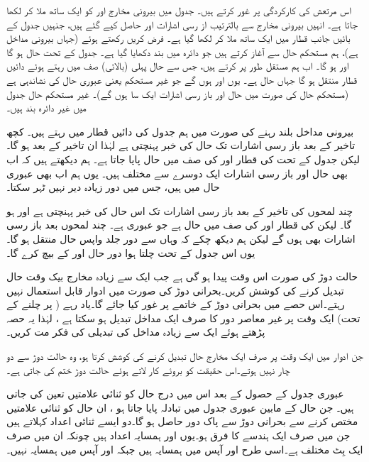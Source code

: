 اس مرتعش کی کارکردگی پر غور کرتے ہیں۔ جدول  میں بیرونی مخارج  اور  کو ایک  ساتھ ملا کر  لکھا جاتا ہے۔ انہیں بیرونی مخارج سے بالترتیب  از رسی  اشارات   اور  حاصل کیے  گئے  ہیں، جنہیں جدول کے بائیں جانب قطار میں ایک ساتھ ملا کر  لکھا گیا ہے۔  فرض کریں  رکھتے ہوئے (جہاں  بیرونی مداخل ہے)،  ہم مستحکم حال  سے آغاز کرتے ہیں جو دائرہ میں بند دکھایا گیا ہے۔ جدول کے تحت  حال  ہو گا اور   ہو گا۔ اب ہم  مستقل طور پر  کرتے ہیں، جس سے حال پہلی  (بالائی) صف  میں رہتے ہوئے دائیں قطار منتقل ہو گا جہاں حال  ہے۔ یوں  اور  ہوں گے جو غیر مستحکم یعنی عبوری حال کی نشاندہی ہے (مستحکم حال کی صورت میں حال اور باز رسی اشارات ایک سا ہوں گے)۔  غیر  مستحکم حال  جدول میں غیر  دائرہ بند ہیں۔

بیرونی مداخل بلند رہنے کی صورت میں ہم جدول کی  دائیں قطار میں رہتے ہیں۔    کچھ تاخیر کے بعد باز رسی اشارات تک حال  کی خبر پہنچتی ہے لہٰذا  ان تاخیر کے بعد  ہو گا۔ لیکن جدول کے تحت  کی قطار اور  کی صف میں  حال  پایا جاتا ہے۔ ہم دیکھتے ہیں کہ اب بھی  حال  اور باز رسی اشارات  ایک دوسرے سے مختلف ہیں۔ یوں ہم اب بھی عبوری حال میں ہیں، جس میں دور زیادہ دیر   نہیں ٹہر سکتا۔ 

چند لمحوں کی تاخیر کے بعد باز رسی اشارات   تک اس حال کی خبر پہنچتی ہے اور  ہو گا۔ لیکن  کی  قطار اور  کی صف میں حال  ہے جو عبوری ہے۔  چند لمحوں بعد باز رسی اشارات بھی  ہوں گے لیکن ہم دیکھ چکے کہ وہاں سے دور جلد واپس حال   منتقل ہو گا۔ یوں  اس جدول کے تحت چلتا ہوا دور حال  اور  کے بیچ    کرے  گا۔ 

حالت دوڑ کی صورت اس وقت پیدا ہو گی ہے جب ایک سے زیادہ مخارج بیک وقت حال تبدیل کرنے کی کوشش کریں۔بحرانی دوڑ کی صورت میں ادوار قابل استعمال نہیں رہتے۔اس حصے میں بحرانی دوڑ کے خاتمے پر غور کیا جائے گا۔یاد رہے ( پر چلنے کے تحت) ایک وقت پر غیر معاصر دور کا صرف ایک مداخل تبدیل ہو سکتا ہے ، لہٰذا یہ حصہ پڑھتے ہوئے ایک سے زیادہ مداخل کی تبدیلی کی فکر مت کریں۔

جن ادوار میں ایک وقت پر صرف ایک مخارج حال تبدیل کرنے کی کوشش کرتا ہو، وہ حالت دوڑ سے دو چار نہیں ہوتے۔اس حقیقت کو بروئے کار لاتے ہوئے حالت دوڑ ختم کی جاتی ہے۔

عبوری جدول کے حصول کے بعد اس میں درج حال کو ثنائی علامتیں تعین کی جاتی ہیں۔  جن  حال کے مابین عبوری جدول میں تبادلہ پایا جاتا ہو ،  ان حال کو  ثنائی علامتیں مختص کرنے سے بحرانی دوڑ سے پاک دور حاصل ہو گا۔دو ایسے ثنائی اعداد  کہلاتے ہیں جن میں صرف ایک ہندسے کا فرق ہو۔یوں  اور  ہمسایہ اعداد ہیں چونکہ ان میں صرف ایک بِٹ مختلف ہے۔اسی طرح  اور  آپس میں ہمسایہ ہیں جبکہ  اور  آپس میں ہمسایہ نہیں۔

